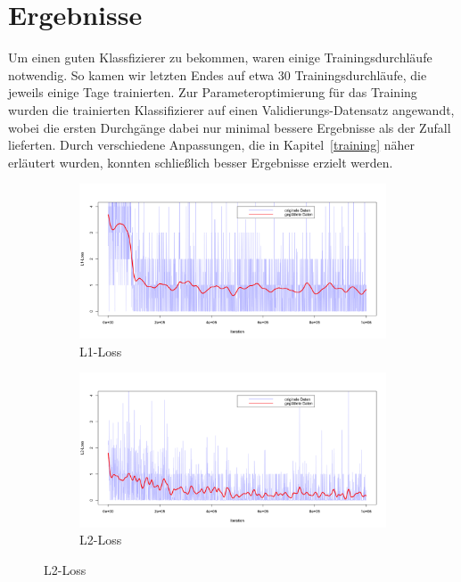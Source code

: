 \section{Ergebnisse}

Um einen guten Klassfizierer zu bekommen, waren einige Trainingsdurchläufe notwendig. So kamen wir letzten Endes auf etwa 30 Trainingsdurchläufe, die jeweils einige Tage trainierten. Zur Parameteroptimierung für das Training wurden die trainierten Klassifizierer auf einen Validierungs-Datensatz angewandt, wobei die ersten Durchgänge dabei nur minimal bessere Ergebnisse als der Zufall lieferten. Durch verschiedene Anpassungen, die in Kapitel~\ref{training} näher erläutert wurden, konnten schließlich besser Ergebnisse erzielt werden. 


\begin{figure}[htb!]
	\centering
	\begin{subfigure}[t]{0.49\textwidth}
		\includegraphics[width=\textwidth]{pics/losses/l1_loss.png}
		\caption{L1-Loss}
		\label{fig:losses_l1}
	\end{subfigure}
	\hfill
	\begin{subfigure}[t]{0.49\textwidth}
		\includegraphics[width=\textwidth]{pics/losses/l2_loss.png}
		\caption{L2-Loss}
		\label{fig:losses_l2}

\end{subfigure}
\end{figure}
